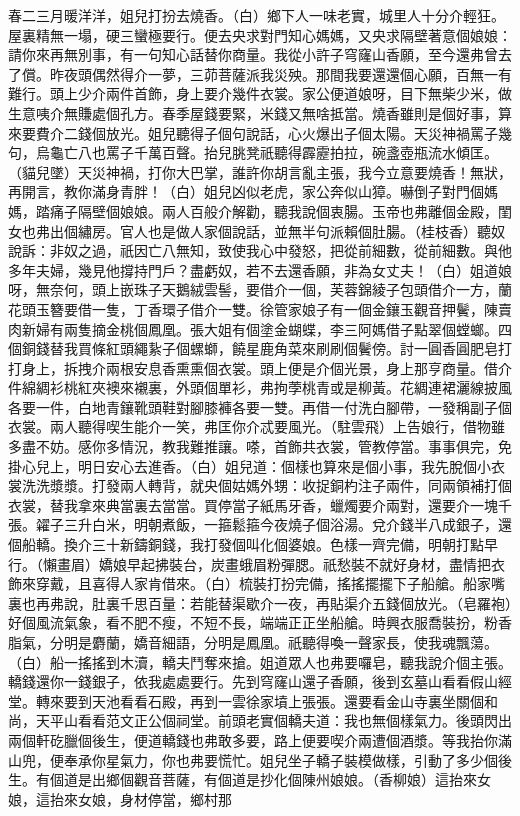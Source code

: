 春二三月暖洋洋，姐兒打扮去燒香。（白）鄉下人一味老實，城里人十分介輕狂。屋裏精無一塌，硬三蠻極要行。便去央求對門知心媽媽，又央求隔壁著意個娘娘：請你來再無別事，有一句知心話替你商量。我從小許子穹窿山香願，至今還弗曾去了償。昨夜頭偶然得介一夢，三茆菩薩派我災殃。那間我要還還個心願，百無一有難行。頭上少介兩件首飾，身上要介幾件衣裳。家公便道娘呀，目下無柴少米，做生意咦介無賺處個孔方。春季屋錢要緊，米錢又無啥抵當。燒香雖則是個好事，算來要費介二錢個放光。姐兒聽得子個句說話，心火爆出子個太陽。天災神禍罵子幾句，烏龜亡八也罵子千萬百聲。抬兒朓凳祇聽得霹靂拍拉，碗盞壺瓶流水傾匡。（貓兒墜）天災神禍，打你大巴掌，誰許你胡言亂主張，我今立意要燒香！無狀，再開言，教你滿身青胖！（白）姐兒凶似老虎，家公奔似山獐。嚇倒子對門個媽媽，踏痛子隔壁個娘娘。兩人百般介解勸，聽我說個衷腸。玉帝也弗離個金殿，閨女也弗出個繡房。官人也是做人家個說話，並無半句派賴個肚腸。（桂枝香）聽奴說訴：非奴之過，祇因亡八無知，致使我心中發怒，把從前細數，從前細數。與他多年夫婦，幾見他撐持門戶？盡虧奴，若不去還香願，非為女丈夫！（白）姐道娘呀，無奈何，頭上嵌珠子天鵝絨雲髻，要借介一個，芙蓉錦綾子包頭借介一方，蘭花頭玉簪要借一隻，丁香環子借介一雙。徐管家娘子有一個金鑲玉觀音押鬢，陳賣肉新婦有兩隻摘金桃個鳳凰。張大姐有個塗金蝴蝶，李三阿媽借子點翠個螳螂。四個銅錢替我買條紅頭繩紥子個螺螄，饒星鹿角菜來刷刷個鬢傍。討一圓香圓肥皂打打身上，拆拽介兩根安息香熏熏個衣裳。頭上便是介個光景，身上那亨商量。借介件綿綢衫桃紅夾襖來襯裏，外頭個單衫，弗拘荸桃青或是柳黃。花綢連裙灑線披風各要一件，白地青鑲靴頭鞋對腳膝褲各要一雙。再借一付洗白腳帶，一發稱副子個衣裳。兩人聽得喫生能介一笑，弗匡你介忒要風光。（駐雲飛）上告娘行，借物雖多盡不妨。感你多情況，教我難推讓。嗏，首飾共衣裳，管教停當。事事俱完，免掛心兒上，明日安心去進香。（白）姐兒道：個樣也算來是個小事，我先脫個小衣裳洗洗漿漿。打發兩人轉背，就央個姑媽外甥：收捉銅杓注子兩件，同兩領補打個衣裳，替我拿來典當裏去當當。買停當子紙馬牙香，蠟燭要介兩對，還要介一塊千張。糴子三升白米，明朝煮飯，一箍鬆箍今夜燒子個浴湯。兌介錢半八成銀子，還個船轎。換介三十新鑄銅錢，我打發個叫化個婆娘。色樣一齊完備，明朝打點早行。（懶畫眉）嬌娘早起拂裝台，炭畫蛾眉粉彈腮。祇愁裝不就好身材，盡情把衣飾來穿戴，且喜得人家肯借來。（白）梳裝打扮完備，搖搖擺擺下子船艙。船家嘴裏也再弗說，肚裏千思百量：若能替渠歇介一夜，再貼渠介五錢個放光。（皂羅袍）好個風流氣象，看不肥不瘦，不短不長，端端正正坐船艙。時興衣服喬裝扮，粉香脂氣，分明是麝蘭，嬌音細語，分明是鳳凰。祇聽得喚一聲家長，使我魂飄蕩。（白）船一搖搖到木瀆，轎夫鬥奪來搶。姐道眾人也弗要囉皂，聽我說介個主張。轎錢還你一錢銀子，依我處處要行。先到穹窿山還子香願，後到玄墓山看看假山經堂。轉來要到天池看看石殿，再到一雲徐家墳上張張。還要看金山寺裏坐關個和尚，天平山看看范文正公個祠堂。前頭老實個轎夫道：我也無個樣氣力。後頭閃出兩個軒矻臘個後生，便道轎錢也弗敢多要，路上便要喫介兩遭個酒漿。等我抬你滿山兜，便奉承你星氣力，你也弗要慌忙。姐兒坐子轎子裝模做樣，引動了多少個後生。有個道是出鄉個觀音菩薩，有個道是抄化個陳州娘娘。（香柳娘）這抬來女娘，這抬來女娘，身材停當，鄉村那